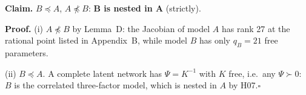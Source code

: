 \documentclass[10pt,a4paper]{article}
\newcommand{\nest}{\preceq}
\newcommand{\nnest}{\not\preceq}
\begin{document}
\par\bigskip
\noindent\textbf{Claim.} $B \nest A$, $A \nnest B$: \textbf{B is nested in A} (strictly).\par\smallskip
\noindent\textbf{Proof.} (i) $A\nnest B$ by Lemma~D: the Jacobian of model $A$ has rank 27 at the rational point listed in Appendix~B, while model $B$ has only $q_B=21$ free parameters.\par\smallskip
\noindent(ii) $B\nest A$. A complete latent network has $\Psi=K^{-1}$ with $K$ free, i.e.\ any $\Psi\succ0$: $B$ is the correlated three-factor model, which is nested in $A$ by H07.\hfill$\square$\par\medskip
{}

\clearpage
\end{document}
